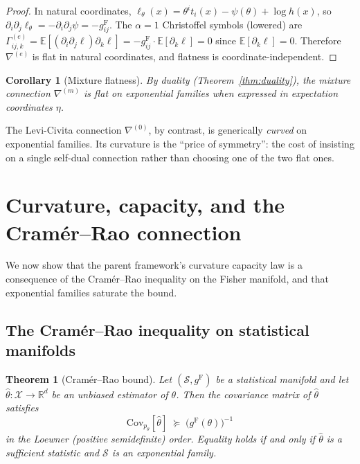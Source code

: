 \documentclass[11pt]{article}
\newcommand{\E}{\mathbb{E}}
\newcommand{\Cov}{\mathrm{Cov}}
\newcommand{\RR}{\mathbb{R}}
\newcommand{\gF}{g^{\mathrm{F}}}
\newtheorem{theorem}{Theorem}
\newtheorem{corollary}{Corollary}
\theoremstyle{remark}
\begin{document}
\begin{proof}
In natural coordinates, $\ell_\theta(x) = \theta^i t_i(x) - \psi(\theta)
+ \log h(x)$, so $\partial_i \partial_j \ell_\theta = -\partial_i \partial_j
\psi = -\gF_{ij}$.  The $\alpha = 1$ Christoffel symbols
(lowered) are
$\Gamma^{(e)}_{ij,k} = \E[(\partial_i \partial_j \ell) \partial_k \ell]
= -\gF_{ij} \cdot \E[\partial_k \ell] = 0$
since $\E[\partial_k \ell] = 0$.  Therefore $\nabla^{(e)}$ is flat in natural
coordinates, and flatness is coordinate-independent.
\end{proof}

\begin{corollary}[Mixture flatness]\label{cor:m-flat}
By duality (Theorem~\ref{thm:duality}), the mixture connection $\nabla^{(m)}$
is flat on exponential families when expressed in expectation coordinates
$\eta$.
\end{corollary}

The Levi-Civita connection $\nabla^{(0)}$, by contrast, is generically
\emph{curved} on exponential families.  Its curvature is the ``price of
symmetry'': the cost of insisting on a single self-dual connection rather than
choosing one of the two flat ones.

\section{Curvature, capacity, and the Cram\'er--Rao connection}
\label{sec:curvature-capacity}

We now show that the parent framework's curvature capacity law is a
consequence of the Cram\'er--Rao inequality on the Fisher manifold, and that
exponential families saturate the bound.

\subsection{The Cram\'er--Rao inequality on statistical manifolds}

\begin{theorem}[Cram\'er--Rao bound]\label{thm:cramer-rao}
Let $(\mathcal{S}, \gF)$ be a statistical manifold and let
$\hat\theta : \mathcal{X} \to \RR^d$ be an unbiased estimator of $\theta$.
Then the covariance matrix of $\hat\theta$ satisfies
\begin{equation}\label{eq:cramer-rao}
\Cov_{p_\theta}[\hat\theta]
\;\succeq\;
\bigl(\gF(\theta)\bigr)^{-1}
\end{equation}
in the Loewner (positive semidefinite) order.  Equality holds if and only if
$\hat\theta$ is a sufficient statistic and $\mathcal{S}$ is an exponential
family.
\end{theorem}
\end{document}

